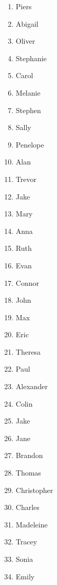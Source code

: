 \begin{figure}[H]
\begin{multicols}{4}
\begin{enumerate}
    \item Piers
    \item Abigail
    \item Oliver
    \item Stephanie
    \item Carol
    \item Melanie
    \item Stephen
    \item Sally
    \item Penelope
    \item Alan
    \item Trevor
    \item Jake
    \item Mary
    \item Anna
    \item Ruth
    \item Evan
    \item Connor
    \item John
    \item Max
    \item Eric
    \item Theresa
    \item Paul
    \item Alexander
    \item Colin
    \item Jake
    \item Jane
    \item Brandon
    \item Thomas
    \item Christopher
    \item Charles
    \item Madeleine
    \item Tracey
    \item Sonia
    \item Emily
\end{enumerate}
\end{multicols}
\end{figure}


